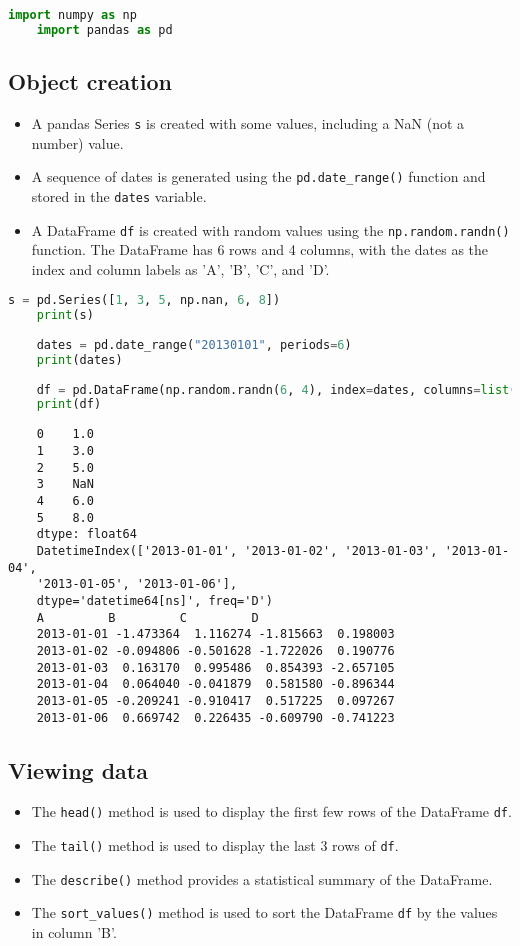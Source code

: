 \begin{lstlisting}[language=Python]
	import numpy as np
	import pandas as pd
\end{lstlisting}






\subsection{Object creation}


\begin{itemize}
	\item A pandas Series \texttt{s} is created with some values, including a NaN (not a number) value.
	\item A sequence of dates is generated using the \texttt{pd.date\_range()} function and stored in the \texttt{dates} variable.
	\item A DataFrame \texttt{df} is created with random values using the \texttt{np.random.randn()} function. The DataFrame has 6 rows and 4 columns, with the dates as the index and column labels as 'A', 'B', 'C', and 'D'.
\end{itemize}

\begin{lstlisting}[language=Python]
	s = pd.Series([1, 3, 5, np.nan, 6, 8])
	print(s)
	
	dates = pd.date_range("20130101", periods=6)
	print(dates)
	
	df = pd.DataFrame(np.random.randn(6, 4), index=dates, columns=list("ABCD"))
	print(df)
\end{lstlisting}

\begin{verbatim}
	0    1.0
	1    3.0
	2    5.0
	3    NaN
	4    6.0
	5    8.0
	dtype: float64
	DatetimeIndex(['2013-01-01', '2013-01-02', '2013-01-03', '2013-01-04',
	'2013-01-05', '2013-01-06'],
	dtype='datetime64[ns]', freq='D')
	A         B         C         D
	2013-01-01 -1.473364  1.116274 -1.815663  0.198003
	2013-01-02 -0.094806 -0.501628 -1.722026  0.190776
	2013-01-03  0.163170  0.995486  0.854393 -2.657105
	2013-01-04  0.064040 -0.041879  0.581580 -0.896344
	2013-01-05 -0.209241 -0.910417  0.517225  0.097267
	2013-01-06  0.669742  0.226435 -0.609790 -0.741223
\end{verbatim}

\subsection{Viewing data}
\begin{itemize}
	\item The \texttt{head()} method is used to display the first few rows of the DataFrame \texttt{df}.
	\item The \texttt{tail()} method is used to display the last 3 rows of \texttt{df}.
	\item The \texttt{describe()} method provides a statistical summary of the DataFrame.
	\item The \texttt{sort\_values()} method is used to sort the DataFrame \texttt{df} by the values in column 'B'.
\end{itemize}

